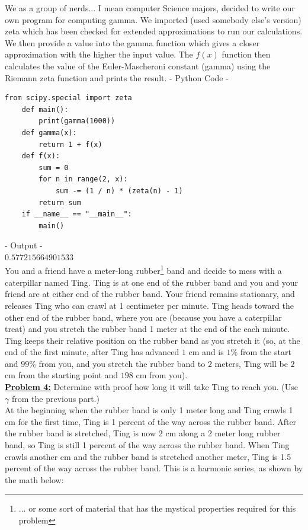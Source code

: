 \documentclass[10pt, AMS Euler]{article}
\begin{document}
We as a group of nerds... I mean computer Science majors, decided to write our own program for computing gamma. We imported (used somebody else's version) zeta which has been checked for extended approximations to run our calculations. We then provide a value into the gamma function which gives a closer approximation with the higher the input value.  The $f(x)$ function then calculates the value of the Euler-Mascheroni constant (gamma) using the Riemann zeta function and prints the result. 
    - Python Code - \\
    \begin{lstlisting}[style=python]
    from scipy.special import zeta 
    def main(): 
        print(gamma(1000)) 
    def gamma(x): 
        return 1 + f(x) 
    def f(x): 
        sum = 0
        for n in range(2, x): 
            sum -= (1 / n) * (zeta(n) - 1) 
        return sum 
    if __name__ == "__main__": 
        main() 
    \end{lstlisting}
    - Output - \\
    $0.577215664901533$ \\



	  You and a friend have a meter-long rubber\footnote{... or some sort of material that has the mystical properties required for this problem} band and decide to mess with a caterpillar named Ting.  
	Ting is at one end of the rubber band and you and your friend are at either end of the rubber band.  Your friend remains stationary, and releases Ting who can crawl at 1 centimeter per minute.  Ting heads toward the other end of the rubber band, where you are (because you have a caterpillar treat) and you stretch the rubber band  1 meter at the end of the each minute.  Ting keeps their relative position on the rubber band as you stretch it (so, at the end of the first minute, after Ting has advanced $1$ cm and is $1\%$ from the start and $99\%$ from you, and you stretch the rubber band to $2$ meters, Ting will be $2$ cm from the starting point and $198$ cm from you). \\
	
	\noindent\underline{{\bf Problem 4:}} Determine with proof how long it will take Ting to reach you.  (Use $\gamma$ from the previous part.)\\ 

At the beginning when the rubber band is only 1 meter long and Ting crawls 1 cm for the first time, Ting is 1 percent of the way across the rubber band. After the rubber band is stretched, Ting is now 2 cm along a 2 meter long rubber band, so Ting is still 1 percent of the way across the rubber band. When Ting crawls another cm and the rubber band is stretched another meter, Ting is 1.5 percent of the way across the rubber band. This is a harmonic series, as shown by the math below:\\
\end{document}
